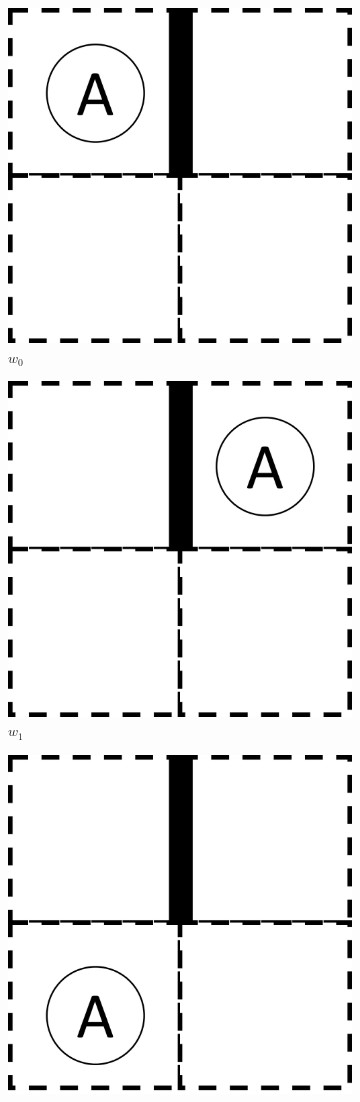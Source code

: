 \begin{figure}[H]
  \centering
    \begin{subfigure}[b]{0.45\linewidth}
        \centering
        \includegraphics[width=0.5\linewidth]{5BeyondSBDRL/Old/Images/2x2_with_wall_world_states/w0.png}
        \caption{$w_{0}$}
        \vspace{0.25cm}
    \end{subfigure}
    \begin{subfigure}[b]{0.45\linewidth}
        \centering
        \includegraphics[width=0.5\linewidth]{5BeyondSBDRL/Old/Images/2x2_with_wall_world_states/w1.png}
        \caption{$w_{1}$}
        \vspace{0.25cm}
    \end{subfigure}
    \begin{subfigure}[b]{0.45\linewidth}
        \centering
        \includegraphics[width=0.5\linewidth]{5BeyondSBDRL/Old/Images/2x2_with_wall_world_states/w2.png}

\end{subfigure}
\end{figure}
